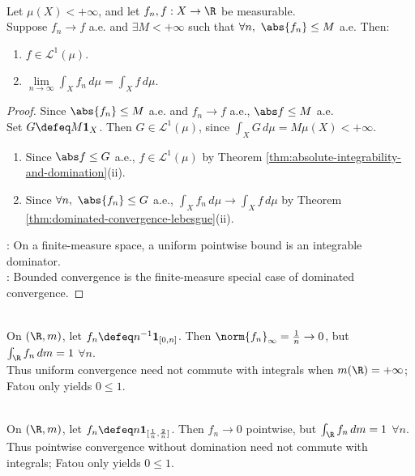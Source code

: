 \begin{theorem} \label{thm:bounded-convergence-finite-measure} \\
Let $\mu(X)<+\infty$, and let $f_n,f:X\to\R$ be measurable.\\
Suppose $f_n\to f$ a.e. and $\exists M<+\infty$ such that $\forall n,\ \abs{f_n}\leq M$ a.e. Then:
\begin{enumerate}[label=(\roman*)]
\setlength{\itemsep}{0pt}
\item $f\in\mathscr{L}^1(\mu)$.
\item $\lim\limits_{n\to\infty}\int_Xf_n\,d\mu=\int_Xf\,d\mu$.
\end{enumerate}
\begin{proof} Since $\abs{f_n}\leq M$ a.e. and $f_n\to f$ a.e., $\abs f\leq M$ a.e.\\
Set $G\defeq M\mathbf{1}_X$. Then $G\in\mathscr{L}^1(\mu)$, since $\int_XG\,d\mu=M\mu(X)<+\infty$.
\begin{enumerate}[label=(\roman*)]
\setlength{\itemsep}{0pt}
\item Since $\abs f\leq G$ a.e., $f\in\mathscr{L}^1(\mu)$ by Theorem \ref{thm:absolute-integrability-and-domination}(ii).
\item Since $\forall n,\ \abs{f_n}\leq G$ a.e., $\int_Xf_n\,d\mu\to\int_Xf\,d\mu$ by Theorem \ref{thm:dominated-convergence-lebesgue}(ii).
\end{enumerate}
: On a finite-measure space, a uniform pointwise bound is an integrable dominator.\\
: Bounded convergence is the finite-measure special case of dominated convergence.
\end{proof}
\end{theorem}

\begin{example} \label{ex:uniform-convergence-needs-finite-measure} \\
On $(\R,m)$, let $f_n\defeq n^{-1}\mathbf{1}_{[0,n]}$. Then $\norm{f_n}_\infty=\frac{1}{n}\to0$, but $\int_\R f_n\,dm=1$ $\forall n$.\\
Thus uniform convergence need not commute with integrals when $m(\R)=+\infty$; Fatou only yields $0\leq1$.
\end{example}

\begin{example} \label{ex:dominated-convergence-needs-domination} \\
On $(\R,m)$, let $f_n\defeq n\mathbf{1}_{[\frac{1}{n},\frac{2}{n}]}$. Then $f_n\to0$ pointwise, but $\int_\R f_n\,dm=1$ $\forall n$.\\
Thus pointwise convergence without domination need not commute with integrals; Fatou only yields $0\leq1$.
\end{example}

